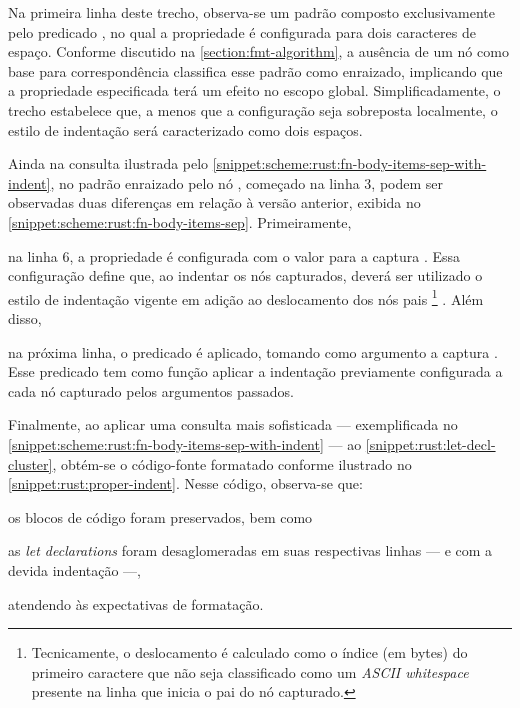\documentclass
  [11pt,a4paper,english,brazil,openright,sumario=tradicional,twoside]
  {abntex2}
\begin{document}
  Na primeira linha deste trecho, observa-se um padrão composto exclusivamente
  pelo predicado , no qual a propriedade
   é configurada para dois caracteres de
  espaço. Conforme discutido na \cref{section:fmt-algorithm}, a ausência de um
  nó como base para correspondência classifica esse padrão como enraizado,
  implicando que a propriedade especificada terá um efeito no escopo global.
  Simplificadamente, o trecho
   estabelece que, a menos
  que a configuração  seja sobreposta
  localmente, o estilo de indentação será caracterizado como dois espaços.

  Ainda na consulta ilustrada pelo
  \cref{snippet:scheme:rust:fn-body-items-sep-with-indent}, no padrão enraizado
  pelo nó , começado na linha 3, podem ser
  observadas duas diferenças em relação à versão anterior, exibida no
  \cref{snippet:scheme:rust:fn-body-items-sep}. Primeiramente,
  \begin{inparaenum}
    \item na linha 6, a propriedade  é
          configurada com o valor  para a captura
          . Essa configuração define que, ao indentar
          os nós capturados, deverá ser utilizado o estilo de indentação
          vigente em adição ao deslocamento dos nós pais%
          \footnote
            { Tecnicamente, o deslocamento é calculado como o índice (em bytes)
              do primeiro caractere que não seja classificado como um
              \textit{ASCII whitespace} \cite{infra-2023-ascii} presente na
              linha que inicia o pai do nó capturado.}%
          . Além disso,
    \item na próxima linha, o predicado  é aplicado,
          tomando como argumento a captura . Esse
          predicado tem como função aplicar a indentação previamente
          configurada a cada nó capturado pelos argumentos passados.
  \end{inparaenum}

  Finalmente, ao aplicar uma consulta mais sofisticada --- exemplificada no
  \cref{snippet:scheme:rust:fn-body-items-sep-with-indent} --- ao
  \cref{snippet:rust:let-decl-cluster}, obtém-se o código-fonte formatado
  conforme ilustrado no \cref{snippet:rust:proper-indent}. Nesse código,
  observa-se que:
  \begin{inparaenum}
    \item os blocos de código foram preservados, bem como
    \item as \textit{let declarations} foram desaglomeradas em suas respectivas
          linhas --- e com a devida indentação ---,
  \end{inparaenum}
  atendendo às expectativas de formatação.
\end{document}
